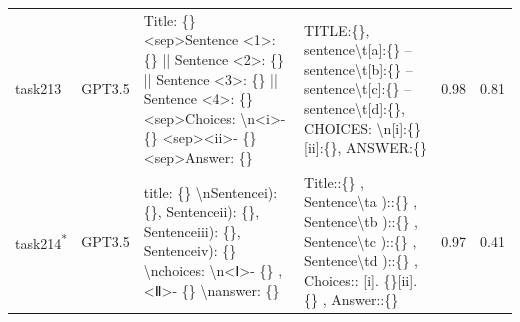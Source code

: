 \begin{longtable}{@{}p{0.8cm\tiny}p{1cm\tiny}p{4.1cm\ttfamily\tiny}p{4.1cm\ttfamily\tiny}p{0.8cm\tiny}p{0.8cm\tiny}@{}}
task213   & GPT3.5    & Title: \{\} \textless{}sep\textgreater Sentence  \textless{}1\textgreater{}: \{\} || Sentence  \textless{}2\textgreater{}: \{\} || Sentence  \textless{}3\textgreater{}: \{\} || Sentence  \textless{}4\textgreater{}: \{\} \textless{}sep\textgreater Choices: \textbackslash{}n\textless{}i\textgreater{}- \{\} \textless{}sep\textgreater \textless{}ii\textgreater{}- \{\} \textless{}sep\textgreater Answer: \{\}                                                                                                  & TITLE:\{\}, sentence\textbackslash{}t{[}a{]}:\{\} -- sentence\textbackslash{}t{[}b{]}:\{\} -- sentence\textbackslash{}t{[}c{]}:\{\} -- sentence\textbackslash{}t{[}d{]}:\{\}, CHOICES: \textbackslash{}n{[}i{]}:\{\}  {[}ii{]}:\{\}, ANSWER:\{\}                                                                                                                                                                                                                                                                                                                                  & 0.98 & 0.81 \\
task214\textsuperscript{*}   & GPT3.5    & title: \{\} \textbackslash{}nSentencei): \{\}, Sentenceii): \{\}, Sentenceiii): \{\}, Sentenceiv): \{\} \textbackslash{}nchoices:  \textbackslash{}n\textless{}Ⅰ\textgreater{}- \{\} ,  \textless{}Ⅱ\textgreater{}- \{\} \textbackslash{}nanswer: \{\}                                                                                                                                                                                                                                                                  & Title::\{\} , Sentence\textbackslash{}ta )::\{\} ,  Sentence\textbackslash{}tb )::\{\} ,  Sentence\textbackslash{}tc )::\{\} ,  Sentence\textbackslash{}td )::\{\} , Choices::  {[}i{]}. \{\}{[}ii{]}. \{\} , Answer::\{\}                                                                                                                                                                                                                                                                                                                                                        & 0.97 & 0.41 \\

\end{longtable}

